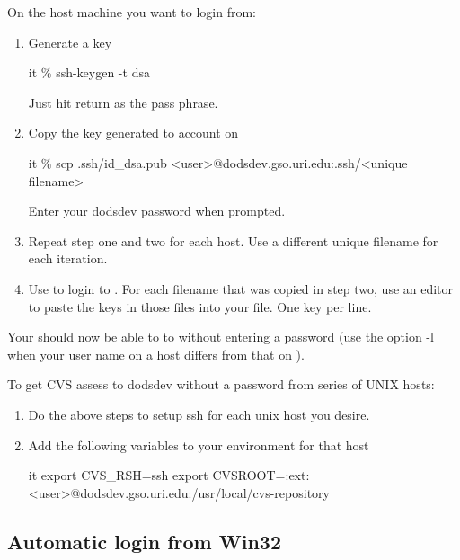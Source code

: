 \documentclass{dods-paper}
\begin{document}
On the host machine you want to login from:
\begin{enumerate}
\item Generate a  key\\
\begin{vcode}{it}
\% ssh-keygen -t dsa
\end{vcode}

Just hit return as the pass phrase.

\item Copy the key generated to account on \\
\begin{vcode}{it}
\% scp .ssh/id_dsa.pub <user>@dodsdev.gso.uri.edu:.ssh/<unique filename>
\end{vcode}

Enter your dodsdev password when prompted.

\item Repeat step one and two for each host. Use a different unique filename
    for each iteration.

\item Use  to login to . For each filename
    that was copied in step two, use an editor to paste the keys in those
    files into your  file. One key per
    line.
\end{enumerate}

Your should now be able to  to  without
entering a password (use the  option -l  when your user
name on a host differs from that on ).

To get CVS assess to dodsdev without a password from series
of UNIX hosts:
\begin{enumerate}
\item Do the above steps to setup ssh for each unix host you
    desire.
\item Add the following variables to your environment for that
    host
    \begin{vcode}{it}
      export CVS\_RSH=ssh
      export CVSROOT=:ext:<user>@dodsdev.gso.uri.edu:/usr/local/cvs-repository
    \end{vcode}
\end{enumerate}

\subsection{Automatic login from Win32}
\end{document}
